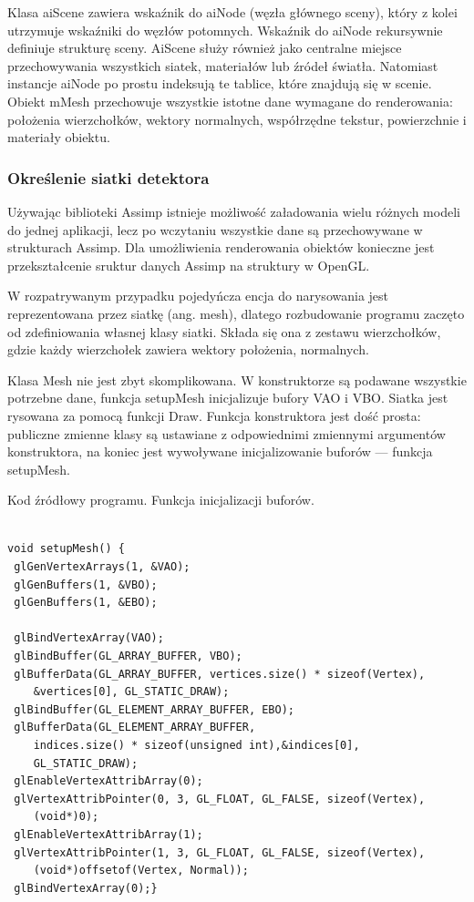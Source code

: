 Klasa aiScene zawiera wskaźnik do aiNode (węzła głównego sceny), który z kolei utrzymuje wskaźniki do węzłów potomnych. Wskaźnik do aiNode rekursywnie definiuje strukturę sceny. AiScene służy również jako centralne miejsce przechowywania wszystkich siatek, materiałów lub źródeł światła. Natomiast instancje aiNode po prostu indeksują te tablice, które znajdują się w scenie. Obiekt mMesh przechowuje wszystkie istotne dane wymagane do renderowania: położenia wierzchołków, wektory normalnych, współrzędne tekstur, powierzchnie i materiały obiektu.

\subsubsection{Określenie siatki detektora}
Używając biblioteki Assimp istnieje możliwość załadowania wielu różnych modeli do jednej aplikacji, lecz po wczytaniu wszystkie dane są przechowywane w strukturach Assimp. Dla umożliwienia renderowania obiektów konieczne jest przekształcenie sruktur danych Assimp na struktury w OpenGL. 

W rozpatrywanym przypadku pojedyńcza encja do narysowania jest reprezentowana przez siatkę (ang. mesh), dlatego rozbudowanie programu zaczęto od zdefiniowania własnej klasy siatki. Składa się ona z zestawu wierzchołków, gdzie każdy wierzchołek zawiera wektory położenia, normalnych.

Klasa Mesh nie jest zbyt skomplikowana. W konstruktorze są podawane wszystkie potrzebne dane, funkcja setupMesh inicjalizuje bufory VAO i VBO. Siatka jest rysowana za pomocą funkcji Draw. Funkcja konstruktora jest dość prosta: publiczne zmienne klasy są ustawiane  z odpowiednimi zmiennymi argumentów konstruktora, na koniec jest wywoływane inicjalizowanie buforów --- funkcja setupMesh. 
\begin{table}[H]
\caption{Kod źródłowy programu. Funkcja inicjalizacji buforów.}
\label{tab12}
\begin{lstlisting}[frame=single]  % Start your code-block

void setupMesh() {
 glGenVertexArrays(1, &VAO);
 glGenBuffers(1, &VBO);
 glGenBuffers(1, &EBO);

 glBindVertexArray(VAO);
 glBindBuffer(GL_ARRAY_BUFFER, VBO);
 glBufferData(GL_ARRAY_BUFFER, vertices.size() * sizeof(Vertex), 
 	&vertices[0], GL_STATIC_DRAW);
 glBindBuffer(GL_ELEMENT_ARRAY_BUFFER, EBO);
 glBufferData(GL_ELEMENT_ARRAY_BUFFER, 
 	indices.size() * sizeof(unsigned int),&indices[0], 
 	GL_STATIC_DRAW);
 glEnableVertexAttribArray(0);
 glVertexAttribPointer(0, 3, GL_FLOAT, GL_FALSE, sizeof(Vertex), 
 	(void*)0);
 glEnableVertexAttribArray(1);
 glVertexAttribPointer(1, 3, GL_FLOAT, GL_FALSE, sizeof(Vertex),
 	(void*)offsetof(Vertex, Normal));
 glBindVertexArray(0);}
\end{lstlisting}
\end{table}

